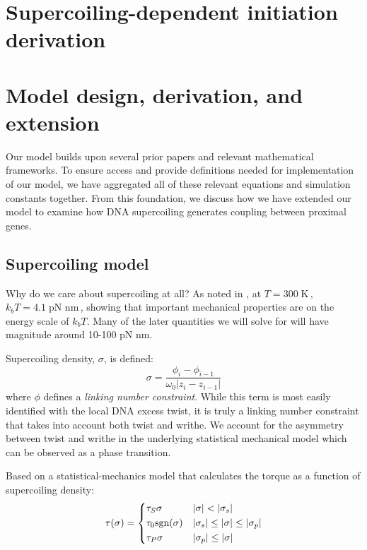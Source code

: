 \documentclass[11pt]{article}
\newcommand{\unit}[1]{\; \text{#1}\,}
\begin{document}
\printbibliography

\clearpage
\appendix
\renewcommand{\appendixpagename}{Supplemental information}
\renewcommand{\thefigure}{S\arabic{figure}}
\setcounter{figure}{0}
\appendixpage
\section{Supercoiling-dependent initiation derivation} \label{sec:sc_initation_derivation}


\section{Model design, derivation, and extension}
\label{sec:appendix:model}
Our model builds upon several prior papers and relevant mathematical frameworks. To ensure access and provide definitions needed for implementation of our model, we have aggregated all of these relevant equations and simulation constants together. From this foundation, we discuss how we have extended our model to examine how DNA supercoiling generates coupling between proximal genes. 

\subsection{Supercoiling model}
Why do we care about supercoiling at all? As noted in \textcite{markoTorqueDynamicsLinking2007}, at \(T = 300 \unit{K}\), \(k_b T = 4.1 \unit{pN nm}\), showing that
important mechanical properties are on the energy scale of \(k_b T\). Many of the later quantities we will solve for will have magnitude around 10-100 pN nm.

Supercoiling density, \(\sigma\),  is defined:
\begin{equation}
    \sigma = \frac{\phi_i - \phi_{i - 1}}{\omega_0 | z_{i} - z_{i-1}|}
    \label{eq:sc_density}
\end{equation}
where \(\phi\) defines a \emph{linking number constraint}. While this term is most easily identified with the local DNA excess twist, it is truly a linking number constraint that takes into account both twist and writhe. We account for the asymmetry between twist and writhe in the underlying statistical mechanical model which can be observed as a phase transition.

Based on a statistical-mechanics model that calculates the torque as a function of supercoiling density:
\begin{equation}
    \tau(\sigma) = \begin{dcases} \tau_S \sigma & |\sigma| < |\sigma_s| \\ \tau_0 \text{sgn}(\sigma) & |\sigma_s| \leq |\sigma | \leq |\sigma_p| \\ \tau_P \sigma & |\sigma_p| \leq |\sigma|\end{dcases}
\end{equation}
\end{document}
